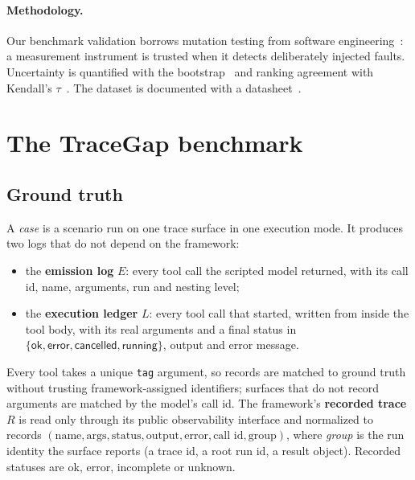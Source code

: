 \documentclass[10pt]{article}
\begin{document}
\paragraph{Methodology.} Our benchmark validation borrows mutation testing from software engineering~\citep{demillo1978hints}: a measurement instrument is trusted when it detects deliberately injected faults. Uncertainty is quantified with the bootstrap~\citep{efron1993bootstrap} and ranking agreement with Kendall's $\tau$~\citep{kendall1938tau}. The dataset is documented with a datasheet~\citep{gebru2021datasheets}.

\section{The TraceGap benchmark}
\label{sec:method}

\subsection{Ground truth}
A \emph{case} is a scenario run on one trace surface in one execution mode. It produces two logs that do not depend on the framework:
\begin{itemize}
\item the \textbf{emission log} $E$: every tool call the scripted model returned, with its call id, name, arguments, run and nesting level;
\item the \textbf{execution ledger} $L$: every tool call that started, written from inside the tool body, with its real arguments and a final status in $\{\textsf{ok}, \textsf{error}, \textsf{cancelled}, \textsf{running}\}$, output and error message.
\end{itemize}
Every tool takes a unique \texttt{tag} argument, so records are matched to ground truth without trusting framework-assigned identifiers; surfaces that do not record arguments are matched by the model's call id. The framework's \textbf{recorded trace} $R$ is read only through its public observability interface and normalized to records $(\text{name}, \text{args}, \text{status}, \text{output}, \text{error}, \text{call id}, \text{group})$, where \emph{group} is the run identity the surface reports (a trace id, a root run id, a result object). Recorded statuses are \textsf{ok}, \textsf{error}, \textsf{incomplete} or \textsf{unknown}.
\end{document}

